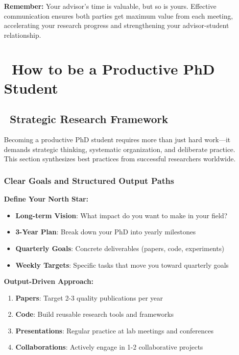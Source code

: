 \documentclass[11pt,a4paper]{article}
\begin{document}
\textbf{Remember:} Your advisor's time is valuable, but so is yours. Effective communication ensures both parties get maximum value from each meeting, accelerating your research progress and strengthening your advisor-student relationship.

\newpage


\newpage

\section{\faRocket~How to be a Productive PhD Student}

\subsection{\faCompass~Strategic Research Framework}

\begin{tcolorbox}[colback=blue!5,colframe=darkblue,title=The Foundation of PhD Success]
Becoming a productive PhD student requires more than just hard work—it demands strategic thinking, systematic organization, and deliberate practice. This section synthesizes best practices from successful researchers worldwide.
\end{tcolorbox}

\subsubsection{Clear Goals and Structured Output Paths}

\textbf{Define Your North Star:}
\begin{itemize}
    \item \textbf{Long-term Vision}: What impact do you want to make in your field?
    \item \textbf{3-Year Plan}: Break down your PhD into yearly milestones
    \item \textbf{Quarterly Goals}: Concrete deliverables (papers, code, experiments)
    \item \textbf{Weekly Targets}: Specific tasks that move you toward quarterly goals
\end{itemize}

\textbf{Output-Driven Approach:}
\begin{enumerate}
    \item \textbf{Papers}: Target 2-3 quality publications per year
    \item \textbf{Code}: Build reusable research tools and frameworks
    \item \textbf{Presentations}: Regular practice at lab meetings and conferences
    \item \textbf{Collaborations}: Actively engage in 1-2 collaborative projects
\end{enumerate}
\end{document}
